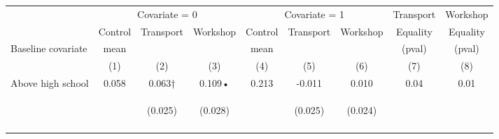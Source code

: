 \begin{tabular}{lcccccccc}
\hline \noalign{\smallskip} & \multicolumn{3}{c}{Covariate = 0} & \multicolumn{3}{c}{Covariate = 1} & Transport & Workshop\\
\cmidrule(lr){2-4}\cmidrule(lr){5-7}\cmidrule(lr){8-9} & Control & {Transport} & {Workshop} & Control & {Transport} & {Workshop} & {Equality} & {Equality}\\
Baseline covariate & mean &  &  & mean &  &  & (pval) & (pval)\\
 & (1) & (2) & (3) & (4) & (5) & (6) & (7) & (8)\\
\noalign{\smallskip}\hline \noalign{\smallskip}Above high school & 0.058 & 0.063† & 0.109• & 0.213 & -0.011 & 0.010 & 0.04 & 0.01\\
 & \begin{footnotesize}\end{footnotesize} & \begin{footnotesize}(0.025)\end{footnotesize} & \begin{footnotesize}(0.028)\end{footnotesize} & \begin{footnotesize}\end{footnotesize} & \begin{footnotesize}(0.025)\end{footnotesize} & \begin{footnotesize}(0.024)\end{footnotesize} & \begin{footnotesize}\end{footnotesize} & \begin{footnotesize}\end{footnotesize}\\
 & \begin{footnotesize}\end{footnotesize} & \begin{footnotesize}[0.027]\end{footnotesize} & \begin{footnotesize}[0.001]\end{footnotesize} & \begin{footnotesize}\end{footnotesize} & \begin{footnotesize}[1.000]\end{footnotesize} & \begin{footnotesize}[0.371]\end{footnotesize} & \begin{footnotesize}\end{footnotesize} & \begin{footnotesize}\end{footnotesize}\\

\end{tabular}
